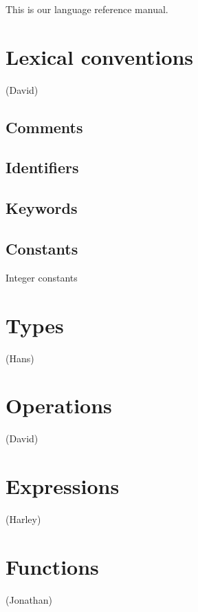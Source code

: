 This is our language reference manual. 

\section{Lexical conventions}

(David)

\subsection{Comments}

\subsection{Identifiers}

\subsection{Keywords}

\subsection{Constants}
Integer constants

\section{Types}

(Hans)

\section{Operations}

(David)

\section{Expressions}

(Harley)

\section{Functions}

(Jonathan)